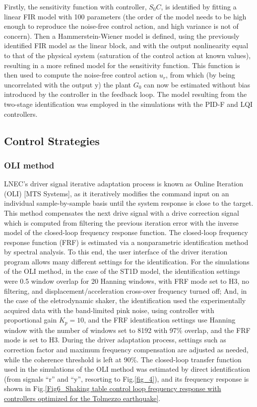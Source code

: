 \documentclass[ 10pt, twocolumn]{article} %
\begin{document}
Firstly, the sensitivity function with controller, $S_0 C$, is identified by fitting a linear FIR model with 100 parameters (the order of the model needs to be high enough to reproduce the noise-free control action, and high variance is not of concern). Then a Hammerstein-Wiener model is defined, using the previously identified FIR model as the linear block, and with the output nonlinearity equal to that of the physical system (saturation of the control action at known values), resulting in a more refined model for the sensitivity function. This function is then used to compute the noise-free control action $u_r$, from which (by being uncorrelated with the output y) the plant $G_0$ can now be estimated without bias introduced by the controller in the feedback loop.  The model resulting from the two-stage identification was employed in the simulations with the PID-F and LQI controllers.


\subsection{Control Strategies}

\subsubsection{OLI method}
LNEC's driver signal iterative adaptation process is known as Online Iteration (OLI) [MTS Systems], as it iteratively modifies the command input on an individual sample-by-sample basis until the system response is close to the target. 
This method compensates the next drive signal with a drive correction signal which is computed from filtering the previous iteration error with the inverse model of the closed-loop frequency response function. The closed-loop frequency response function (FRF) is estimated via a nonparametric identification method by spectral analysis. To this end, the user interface of the driver iteration program allows many different settings for the identification. For the simulations of the OLI method, in the case of the ST1D model, the identification settings were 0.5 window overlap for 20 Hanning windows, with FRF mode set to H3, no filtering, and displacement/acceleration cross-over frequency turned off; And, in the case of the eletrodynamic shaker, the identification used the experimentally acquired data with the band-limited pink noise, using controller with proportional gain $K_p=10$, and the FRF identification settings use Hanning window with the number of windows set to 8192 with 97\% overlap, and the FRF mode is set to H3. During the driver adaptation process, settings such as correction factor and maximum frequency compensation are adjusted as needed, while the coherence threshold is left at 90\%.
The closed-loop transfer function used in the simulations of the OLI method was estimated by direct identification (from signals “r” and “y”, resorting to Fig.\ref{fig_4}), and its frequency response is shown in Fig.\ref{Fig6_Shaking table control loop frequency response with controllers optimized for the Tolmezzo earthquake}.
\end{document}
